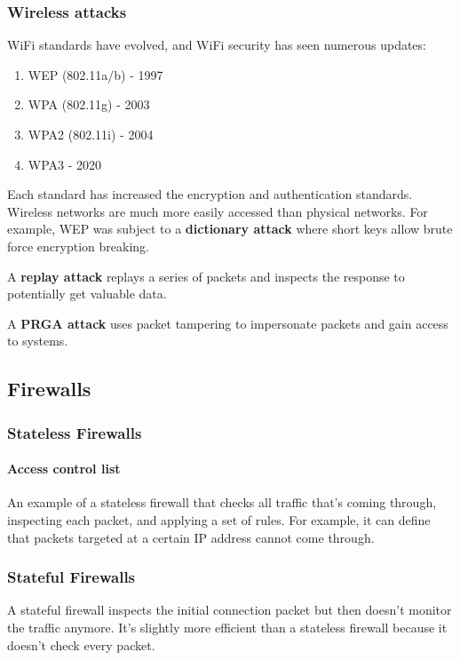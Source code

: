 \subsubsection{Wireless attacks}

WiFi standards have evolved, and WiFi security has seen numerous updates:

\begin{enumerate}
    \item WEP (802.11a/b) - 1997
    \item WPA (802.11g) - 2003
    \item WPA2 (802.11i) - 2004
    \item WPA3 - 2020
\end{enumerate}

Each standard has increased the encryption and authentication standards. Wireless networks are much more easily accessed than physical networks. For example, WEP was subject to a \textbf{dictionary attack} where short keys allow brute force encryption breaking.

A \textbf{replay attack} replays a series of packets and inspects the response to potentially get valuable data.

A \textbf{PRGA attack} uses packet tampering to impersonate packets and gain access to systems.

\subsection{Firewalls}

\subsubsection{Stateless Firewalls}

\paragraph{Access control list} An example of a stateless firewall that checks all traffic that's coming through, inspecting each packet, and applying a set of rules. For example, it can define that packets targeted at a certain IP address cannot come through.

\subsubsection{Stateful Firewalls}

A stateful firewall inspects the initial connection packet but then doesn't monitor the traffic anymore. It's slightly more efficient than a stateless firewall because it doesn't check every packet.

